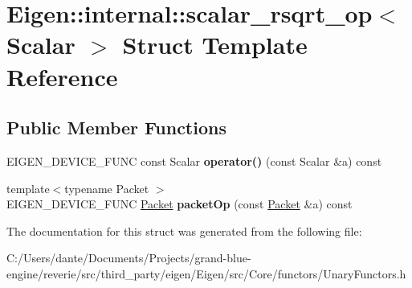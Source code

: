 \hypertarget{struct_eigen_1_1internal_1_1scalar__rsqrt__op}{}\section{Eigen\+::internal\+::scalar\+\_\+rsqrt\+\_\+op$<$ Scalar $>$ Struct Template Reference}
\label{struct_eigen_1_1internal_1_1scalar__rsqrt__op}
\subsection*{Public Member Functions}
\begin{DoxyCompactItemize}
\item 
\mbox{\label{struct_eigen_1_1internal_1_1scalar__rsqrt__op_a9bcf69ff147f7f02a535c4ca8e09c39b}} 
E\+I\+G\+E\+N\+\_\+\+D\+E\+V\+I\+C\+E\+\_\+\+F\+U\+NC const Scalar {\bfseries operator()} (const Scalar \&a) const
\item 
\mbox{\label{struct_eigen_1_1internal_1_1scalar__rsqrt__op_ae2bfe3c291802ee0932e37d0850e3ffc}} 
{\footnotesize template$<$typename Packet $>$ }\\E\+I\+G\+E\+N\+\_\+\+D\+E\+V\+I\+C\+E\+\_\+\+F\+U\+NC \mbox{\hyperlink{union_eigen_1_1internal_1_1_packet}{Packet}} {\bfseries packet\+Op} (const \mbox{\hyperlink{union_eigen_1_1internal_1_1_packet}{Packet}} \&a) const
\end{DoxyCompactItemize}


The documentation for this struct was generated from the following file\+:\begin{DoxyCompactItemize}
\item 
C\+:/\+Users/dante/\+Documents/\+Projects/grand-\/blue-\/engine/reverie/src/third\+\_\+party/eigen/\+Eigen/src/\+Core/functors/Unary\+Functors.\+h\end{DoxyCompactItemize}
